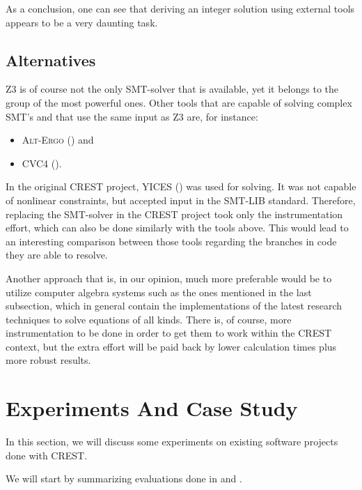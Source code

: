 \documentclass[oribibl, twocolumn]{llncs}
\begin{document}
As a conclusion, one can see that deriving an integer solution using
external tools appears to be a very daunting task.

\subsection{Alternatives}

\textsc{Z3} is of course not the only \textsc{SMT}-solver that is
available, yet it belongs to the group of the most powerful
ones. Other tools that are capable of solving complex SMT's and that use the
same input as \textsc{Z3} are, for instance:
\begin{itemize}
  \item \textsc{Alt-Ergo} (\cite{bobotalt}) and
  \item \textsc{CVC4} (\cite{barrett2011cvc4}).
\end{itemize}

In the original \textsc{CREST} project, \textsc{YICES} (\cite{dutertre2006yices}) was used for
solving. It was not capable of nonlinear constraints, but accepted
input in the SMT-LIB standard. Therefore, replacing the SMT-solver in
the \textsc{CREST} project took only the instrumentation effort, which
can also be done similarly with the tools above. This would lead to an
interesting comparison between those tools regarding the branches in
code they are able to resolve.

Another approach that is, in our opinion, much more preferable would be
to utilize computer algebra systems such as the ones mentioned in the last subsection, 
which in general contain the implementations of the latest research techniques to solve equations
of all kinds. There is, of course, more instrumentation to be done in
order to get them to work within the \textsc{CREST} context, but the
extra effort will be paid back by lower calculation times plus more
robust results.


\section{Experiments And Case Study}
\label{sctn:Experiments}

In this section, we will discuss some experiments on existing software
projects done with
\textsc{CREST}.

We will start by summarizing evaluations done in \cite{CREST} and
\cite{CRESTZ3}.
\end{document}
